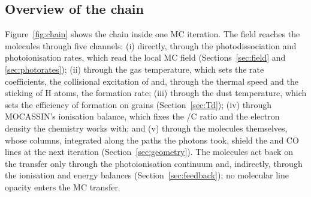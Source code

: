 \subsection{Overview of the chain}

Figure~\ref{fig:chain} shows the chain inside one MC iteration. The field
reaches the molecules through five channels:
(i) directly, through the photodissociation and photoionisation rates, which
read the local MC field (Sections~\ref{sec:field} and \ref{sec:photorates});
(ii) through the gas temperature, which sets the rate coefficients, the
collisional excitation of \Htwo{} and, through the thermal speed and the
sticking of H atoms, the \Htwo{} formation rate;
(iii) through the dust temperature, which sets the efficiency of \Htwo{}
formation on grains (Section~\ref{sec:Td});
(iv) through MOCASSIN's ionisation balance, which fixes the \Cp/C ratio and
the electron density the chemistry works with; and
(v) through the molecules themselves, whose columns, integrated along the
paths the photons took, shield the \Htwo{} and CO lines at the next
iteration (Section~\ref{sec:geometry}).
The molecules act back on the transfer only through the \Htwo{} photoionisation
continuum and, indirectly, through the ionisation and energy balances
(Section~\ref{sec:feedback}); no molecular line opacity enters the MC transfer.

